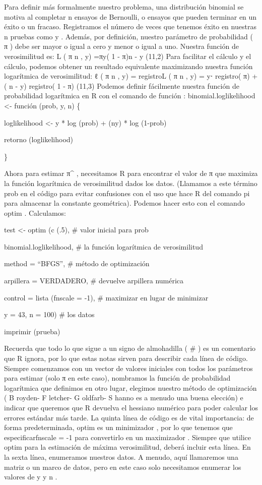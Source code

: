 \documentclass[
]{book}
\begin{document}
Para definir más formalmente nuestro problema, una distribución binomial se motiva al completar n ensayos de Bernoulli, o ensayos que pueden terminar en un éxito o un fracaso. Registramos el número de veces que tenemos éxito en nuestras n pruebas como y . Además, por definición, nuestro parámetro de probabilidad ( π ) debe ser mayor o igual a cero y menor o igual a uno. Nuestra función de verosimilitud es:
L ( π\textbar{} n , y) =πy( 1 - π)n - y
(11,2)
Para facilitar el cálculo y el cálculo, podemos obtener un resultado equivalente maximizando nuestra función logarítmica de verosimilitud:
ℓ ( π\textbar{} n , y) = registroL ( π\textbar{} n , y) = y⋅ registro( π) + ( n - y) registro( 1 - π)
(11,3)
Podemos definir fácilmente nuestra función de probabilidad logarítmica en R con el comando de función :
binomial.loglikelihood \textless- función (prob, y, n) \{

loglikelihood \textless- y * log (prob) + (ny) * log (1-prob)

retorno (loglikelihood)

\}

Ahora para estimar π\^{} , necesitamos R para encontrar el valor de π que maximiza la función logarítmica de verosimilitud dados los datos. (Llamamos a este término prob en el código para evitar confusiones con el uso que hace R del comando pi para almacenar la constante geométrica). Podemos hacer esto con el comando optim . Calculamos:

test \textless- optim (c (.5), \# valor inicial para prob

binomial.loglikelihood, \# la función logarítmica de verosimilitud

method = ``BFGS'', \# método de optimización

arpillera = VERDADERO, \# devuelve arpillera numérica

control = lista (fnscale = -1), \# maximizar en lugar de minimizar

y = 43, n = 100) \# los datos

imprimir (prueba)

Recuerda que todo lo que sigue a un signo de almohadilla ( \# ) es un comentario que R ignora, por lo que estas notas sirven para describir cada línea de código. Siempre comenzamos con un vector de valores iniciales con todos los parámetros para estimar (solo π en este caso), nombramos la función de probabilidad logarítmica que definimos en otro lugar, elegimos nuestro método de optimización ( B royden- F letcher- G oldfarb- S hanno es a menudo una buena elección) e indicar que queremos que R devuelva el hessiano numérico para poder calcular los errores estándar más tarde. La quinta línea de código es de vital importancia: de forma predeterminada, optim es un minimizador , por lo que tenemos que especificarfnscale = -1 para convertirlo en un maximizador . Siempre que utilice optim para la estimación de máxima verosimilitud, deberá incluir esta línea. En la sexta línea, enumeramos nuestros datos. A menudo, aquí llamaremos una matriz o un marco de datos, pero en este caso solo necesitamos enumerar los valores de y y n .
\end{document}
